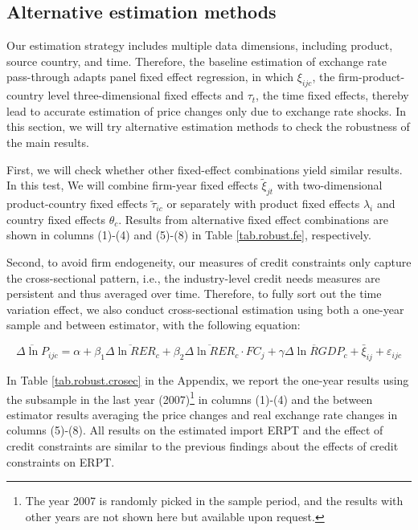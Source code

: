\documentclass[12pt]{article}
\begin{document}
\subsection{Alternative estimation methods}

Our estimation strategy includes multiple data dimensions, including product, source country, and time. Therefore, the baseline estimation of exchange rate pass-through adapts panel fixed effect regression, in which $\xi_{ijc}$, the firm-product-country level three-dimensional fixed effects and $\tau_t$, the time fixed effects, thereby lead to accurate estimation of price changes only due to exchange rate shocks. In this section, we will try alternative estimation methods to check the robustness of the main results.

First, we will check whether other fixed-effect combinations yield similar results. In this test, We will combine firm-year fixed effects $\tilde{\xi}_{jt}$ with two-dimensional product-country fixed effects $\tilde{\tau}_{ic}$ or separately with product fixed effects $\lambda_i$ and country fixed effects $\theta_{c}$.  Results from alternative fixed effect combinations are shown in columns (1)-(4) and (5)-(8) in Table \ref{tab.robust.fe}, respectively. 

Second, to avoid firm endogeneity, our measures of credit constraints only capture the cross-sectional pattern, i.e., the industry-level credit needs measures are persistent and thus averaged over time. Therefore, to fully sort out the time variation effect, we also conduct cross-sectional estimation using both a one-year sample and between estimator, with the following equation:

\begin{equation}
	\overline{\Delta \ln P}_{ijc}=\alpha+\beta_{1} \overline{\Delta \ln RER}_{c}+\beta_{2} \overline{\Delta \ln RER}_{c} \cdot FC_{j}+\gamma \overline{\Delta \ln RGDP}_{c}+\bar{\xi}_{ij} +\varepsilon_{ijc}
	\label{eq.credit.crosec}
\end{equation}

In Table \ref{tab.robust.crosec} in the Appendix, we report the one-year results using the subsample in the last year (2007)\footnote{The year 2007 is randomly picked in the sample period, and the results with other years are not shown here but available upon request.} in columns (1)-(4) and the between estimator results averaging the price changes and real exchange rate changes in columns (5)-(8). All results on the estimated import ERPT and the effect of credit constraints are similar to the previous findings about the effects of credit constraints on ERPT.
\end{document}
